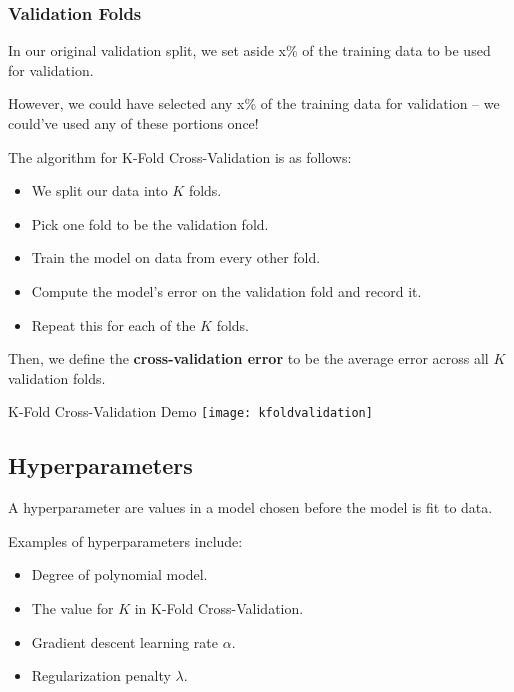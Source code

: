 \documentclass[openany]{book}
\begin{document}
\subsubsection{Validation Folds}
In our original validation split, we set aside x\% of the training data to be used for validation.

However, we could have selected any x\% of the training data for validation -- we could've used any of these portions once!

The algorithm for K-Fold Cross-Validation is as follows:
\begin{itemize}
	\item We split our data into $K$ folds.
	\item Pick one fold to be the validation fold.
	\item Train the model on data from every other fold.
	\item Compute the model's error on the validation fold and record it.
	\item Repeat this for each of the $K$ folds.
\end{itemize}

Then, we define the \textbf{cross-validation error} to be the average error across all $K$ validation folds.

\begin{figurebox}[]{K-Fold Cross-Validation Demo}
	\centering\texttt{[image: kfoldvalidation]}
\end{figurebox}

\subsection{Hyperparameters}
\begin{defn}[Hyperparameter]
	A hyperparameter are values in a model chosen before the model is fit to data.
\end{defn}

\begin{example}
	Examples of hyperparameters include:
	\begin{itemize}
		\item Degree of polynomial model.
		\item The value for $K$ in K-Fold Cross-Validation.
		\item Gradient descent learning rate $\alpha$.
		\item Regularization penalty $\lambda$.
	\end{itemize}
\end{example}
\end{document}
